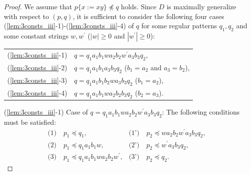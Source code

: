 \begin{proof}
We assume that $p \{ x := xy \} \not\preceq q$ holds.
Since $D$ is maximally generalize {\color{red}with respect to} $(p,q)$, it is sufficient to consider the following four cases (\ref{lem:3consts_iii}-1)-(\ref{lem:3consts_iii}-4) of $q$ for some regular patterns $q_{1},q_{2}$ and some constant strings $w,w^{\prime}$ ($|w|\geq 0$ and $|w^{\prime}|\geq 0$):

\smallskip

\noindent
\begin{tabular}{ll}
(\ref{lem:3consts_iii}-1) & $q=q_{1}a_{1}b_{1}wa_{2}b_{2}w^{\prime}a_{3}b_{3}q_{2}$,\\
(\ref{lem:3consts_iii}-2) & $q=q_{1}a_{1}b_{1}a_{3}b_{3}q_{2}$ ($b_{1}=a_{2}$ and $a_{3}=b_{2}$),\\
(\ref{lem:3consts_iii}-3) & $q=q_{1}a_{1}b_{1}b_{2}wa_{3}b_{3}q_{2}$ ($b_{1}=a_{2}$),\\
(\ref{lem:3consts_iii}-4) & $q=q_{1}a_{1}b_{1}wa_{2}b_{2}b_{3}q_{2}$ ($b_{2}=a_{3}$).
\end{tabular}

\smallskip

\noindent
(\ref{lem:3consts_iii}-1) Case of $q=q_{1}a_{1}b_{1}wa_{2}b_{2}w^{\prime}a_{3}b_{3}q_{2}$:
The following conditions must be satisfied:
\begin{align*}
\textrm{(1)}~& p_{1} \preceq q_{1}, & \textrm{(1')}~& p_{2} \preceq wa_{2}b_{2}w^{\prime}a_{3}b_{3}q_{2}, \\
\textrm{(2)}~& p_{1} \preceq q_{1}a_{1}b_{1}w, & \textrm{(2')}~& p_{2} \preceq w^{\prime}a_{3}b_{3}q_{2}, \\
\textrm{(3)}~& p_{1} \preceq q_{1}a_{1}b_{1}wa_{2}b_{2}w^{\prime}, & \textrm{(3')}~& p_{2} \preceq q_{2}.
\end{align*}


\end{proof}
